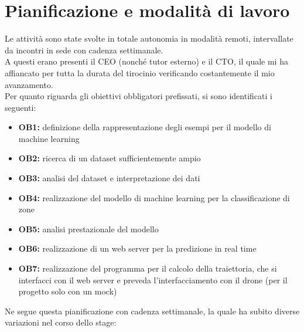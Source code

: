 \section{Pianificazione e modalità di lavoro}
Le attività sono state svolte in totale autonomia in modalità remoti, intervallate da incontri in sede con cadenza settimanale.\\
A questi erano presenti il CEO (nonché tutor esterno) e il CTO, il quale mi ha affiancato per tutta la durata del tirocinio verificando
costantemente il mio avanzamento.\\
Per quanto riguarda gli obiettivi obbligatori prefissati, si sono identificati i seguenti:
\begin{itemize}
		\item \textbf{OB1:} definizione della rappresentazione degli esempi per il modello di machine learning
		\item \textbf{OB2:} ricerca di un dataset sufficientemente ampio
		\item \textbf{OB3:} analisi del dataset e interpretazione dei dati
		\item \textbf{OB4:} realizzazione del modello di machine learning per la classificazione di zone
		\item \textbf{OB5:} analisi prestazionale del modello
		\item \textbf{OB6:} realizzazione di un web server per la predizione in real time
		\item \textbf{OB7:} realizzazione del programma per il calcolo della traiettoria, che si interfacci con il web server e preveda l'interfacciamento con il drone (per il progetto solo con un mock)
\end{itemize}
Ne segue questa pianificazione con cadenza settimanale, la quale ha subito diverse variazioni nel corso dello stage:
